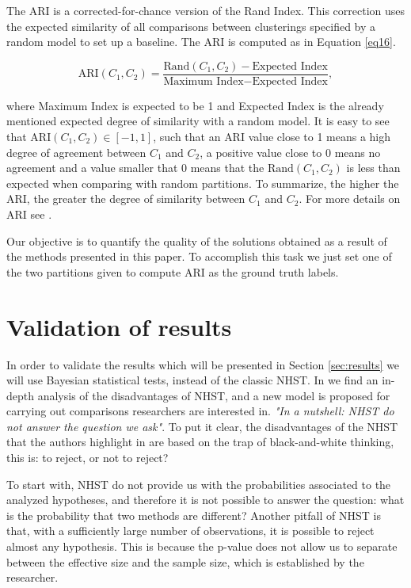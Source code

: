 The \acs{ARI} is a corrected-for-chance version of the Rand Index. This correction uses the expected similarity of all comparisons between clusterings specified by a random model to set up a baseline. The \acs{ARI} is computed as in Equation \eqref{eq16}.

\begin{equation}
\text{ARI}(C_1, C_2) = \frac{\text{Rand}(C_1, C_2) - \text{Expected Index}}{\text{Maximum Index} - \text{Expected Index}},
\label{eq16}
\end{equation}

\noindent where Maximum Index is expected to be 1 and Expected Index is the already mentioned expected degree of similarity with a random model. It is easy to see that $\text{ARI}(C_1, C_2) \in [-1,1]$, such that an \acs{ARI} value close to 1 means a high degree of agreement between $C_1$ and $C_2$, a positive value close to 0 means no agreement and a value smaller that 0 means that the $\text{Rand}(C_1, C_2)$ is less than expected when comparing with random partitions. To summarize, the higher the \acs{ARI}, the greater the degree of similarity between $C_1$ and $C_2$. For more details on \acs{ARI} see \cite{hubert1985comparing}.

Our objective is to quantify the quality of the solutions obtained as a result of the methods presented in this paper. To accomplish this task we just set one of the two partitions given to compute \acs{ARI} as the ground truth labels.

\section{Validation of results} \label{sec:ValidtnMethod}

In order to validate the results which will be presented in Section \ref{sec:results} we will use Bayesian statistical tests, instead of the classic \acf{NHST}. In \cite{benavoli2017time} we find an in-depth analysis of the disadvantages of \acs{NHST}, and a new model is proposed for carrying out comparisons researchers are interested in. \textit{"In a nutshell: \acs{NHST} do not answer the question we ask"}. To put it clear, the disadvantages of the \acs{NHST} that the authors highlight in \cite{benavoli2017time} are based on the trap of black-and-white thinking, this is: to reject, or not to reject?

To start with, \acs{NHST} do not provide us with the probabilities associated to the analyzed hypotheses, and therefore it is not possible to answer the question: what is the probability that two methods are different? Another pitfall of \acs{NHST} is that, with a sufficiently large number of observations, it is possible to reject almost any hypothesis. This is because the p-value does not allow us to separate between the effective size and the sample size, which is established by the researcher.

